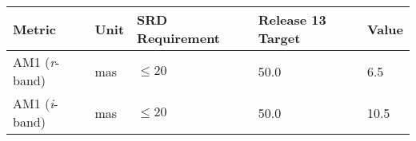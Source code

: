 \documentclass[DM,toc]{lsstdoc}
\begin{document}
\begin{longtable}[]{@{}lllll@{}}
\toprule
\begin{minipage}[b]{0.19\columnwidth}\raggedright\strut
Metric\strut
\end{minipage} & \begin{minipage}[b]{0.08\columnwidth}\raggedright\strut
Unit\strut
\end{minipage} & \begin{minipage}[b]{0.20\columnwidth}\raggedright\strut
SRD Requirement\strut
\end{minipage} & \begin{minipage}[b]{0.22\columnwidth}\raggedright\strut
Release 13 Target\strut
\end{minipage} & \begin{minipage}[b]{0.17\columnwidth}\raggedright\strut
Value\strut
\end{minipage}\tabularnewline
\midrule
\endhead
\begin{minipage}[t]{0.19\columnwidth}\raggedright\strut
AM1 (\emph{r}-band)\strut
\end{minipage} & \begin{minipage}[t]{0.08\columnwidth}\raggedright\strut
mas\strut
\end{minipage} & \begin{minipage}[t]{0.20\columnwidth}\raggedright\strut
\(\leq 20\)\strut
\end{minipage} & \begin{minipage}[t]{0.22\columnwidth}\raggedright\strut
50.0\strut
\end{minipage} & \begin{minipage}[t]{0.17\columnwidth}\raggedright\strut
6.5\strut
\end{minipage}\tabularnewline
\begin{minipage}[t]{0.19\columnwidth}\raggedright\strut
AM1 (\emph{i}-band)\strut
\end{minipage} & \begin{minipage}[t]{0.08\columnwidth}\raggedright\strut
mas\strut
\end{minipage} & \begin{minipage}[t]{0.20\columnwidth}\raggedright\strut
\(\leq 20\)\strut
\end{minipage} & \begin{minipage}[t]{0.22\columnwidth}\raggedright\strut
50.0\strut
\end{minipage} & \begin{minipage}[t]{0.17\columnwidth}\raggedright\strut
10.5\strut
\end{minipage}\tabularnewline

\end{longtable}
\end{document}
